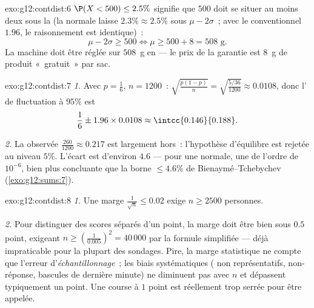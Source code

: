 \begin{solution}{exo:g12:contdist:6}
$\P(X < 500) \leq 2.5\%$ signifie que $500$ doit se situer au moins deux
 sous la  (la normale laisse $2.3\% \approx 2.5\%$ sous
$\mu - 2\sigma$~; avec le conventionnel $1.96$, le raisonnement est
identique)~:
\[
\mu - 2\sigma \geq 500 \iff \mu \geq 500 + 8 = 508 \text{ g}.
\]
La machine doit être réglée sur $508$~g en  --- le prix de la
garantie est $8$~g de produit «~gratuit~» par sac.
\end{solution}

\begin{solution}{exo:g12:contdist:7}
\emph{1.} Avec $p = \frac16$, $n = 1200$~:
$\sqrt{\frac{p(1-p)}{n}} = \sqrt{\frac{5/36}{1200}} \approx 0.0108$, donc
l' de fluctuation à $95\%$ est
\[
\frac16 \pm 1.96 \times 0.0108 \approx \intcc{0.146}{0.188}.
\]

\emph{2.} La  observée $\frac{260}{1200} \approx 0.217$ est
largement hors~: l'hypothèse d'équilibre est rejetée au niveau $5\%$.
L'écart est d'environ $4.6$  --- pour une 
normale, une  de l'ordre de $10^{-6}$, bien plus concluante que
la borne $\leq 4.6\%$ de Bienaymé--Tchebychev
(\cref{exo:g12:sums:7}).
\end{solution}

\begin{solution}{exo:g12:contdist:8}
\emph{1.} Une marge $\frac{1}{\sqrt n} \leq 0.02$ exige
$n \geq 2500$ personnes.

\emph{2.} Pour distinguer des scores séparés d'un point, la marge doit
être bien sous $0.5$ point, exigeant
$n \geq \left(\frac{1}{0.005}\right)^2 = 40\,000$ par la formule
simplifiée --- déjà impraticable pour la plupart des sondages. Pire, la
marge statistique ne compte que l'erreur d'\emph{échantillonnage}~; les
biais systématiques ( non représentatifs, non-réponse, bascules
de dernière minute) ne diminuent pas avec $n$ et dépassent typiquement un
point. Une course à $1$ point est réellement trop serrée pour être
appelée.
\end{solution}

